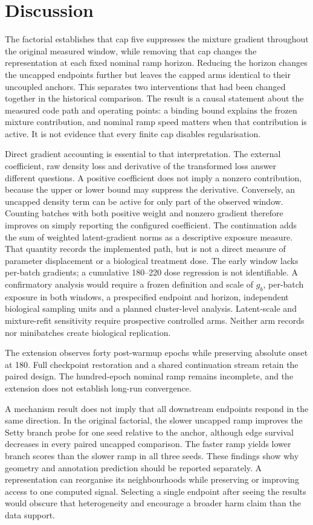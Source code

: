 \documentclass[11pt]{article}
\begin{document}
\section{Discussion}
The factorial establishes that cap five suppresses the mixture gradient throughout the original measured window, while removing that cap changes the representation at each fixed nominal ramp horizon. Reducing the horizon changes the uncapped endpoints further but leaves the capped arms identical to their uncoupled anchors. This separates two interventions that had been changed together in the historical comparison. The result is a causal statement about the measured code path and operating points: a binding bound explains the frozen mixture contribution, and nominal ramp speed matters when that contribution is active. It is not evidence that every finite cap disables regularisation.

Direct gradient accounting is essential to that interpretation. The external coefficient, raw density loss and derivative of the transformed loss answer different questions. A positive coefficient does not imply a nonzero contribution, because the upper or lower bound may suppress the derivative. Conversely, an uncapped density term can be active for only part of the observed window. Counting batches with both positive weight and nonzero gradient therefore improves on simply reporting the configured coefficient. The continuation adds the sum of weighted latent-gradient norms as a descriptive exposure measure. That quantity records the implemented path, but is not a direct measure of parameter displacement or a biological treatment dose.
The early window lacks per-batch gradients; a cumulative 180--220 dose regression is not identifiable. A confirmatory analysis would require a frozen definition and scale of $g_b$, per-batch exposure in both windows, a prespecified endpoint and horizon, independent biological sampling units and a planned cluster-level analysis. Latent-scale and mixture-refit sensitivity require prospective controlled arms. Neither arm records nor minibatches create biological replication.

The extension observes forty post-warmup epochs while preserving absolute onset at 180. Full checkpoint restoration and a shared continuation stream retain the paired design. The hundred-epoch nominal ramp remains incomplete, and the extension does not establish long-run convergence.

A mechanism result does not imply that all downstream endpoints respond in the same direction. In the original factorial, the slower uncapped ramp improves the Setty branch probe for one seed relative to the anchor, although edge survival decreases in every paired uncapped comparison. The faster ramp yields lower branch scores than the slower ramp in all three seeds. These findings show why geometry and annotation prediction should be reported separately. A representation can reorganise its neighbourhoods while preserving or improving access to one computed signal. Selecting a single endpoint after seeing the results would obscure that heterogeneity and encourage a broader harm claim than the data support.
\end{document}
